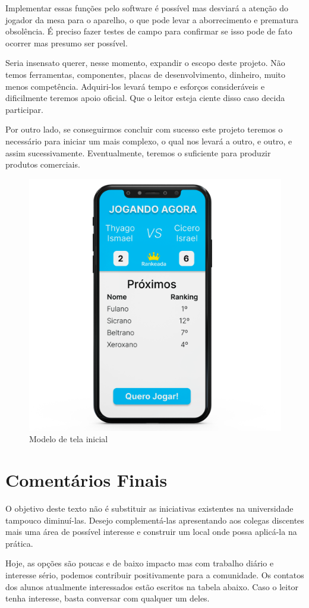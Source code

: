\documentclass[12pt]{article}
\begin{document}
\begin{multicols}{2}
    Implementar essas funções pelo software é possível mas desviará a atenção do jogador da mesa para o aparelho, o que pode levar a aborrecimento e prematura obsolência. É preciso fazer testes de campo para confirmar se isso pode de fato ocorrer mas presumo ser possível.

    Seria insensato querer, nesse momento, expandir o escopo deste projeto. Não temos ferramentas, componentes, placas de desenvolvimento, dinheiro, muito menos competência. Adquiri-los levará tempo e esforços consideráveis e dificilmente teremos apoio oficial. Que o leitor esteja ciente disso caso decida participar.

    Por outro lado, se conseguirmos concluir com sucesso este projeto teremos o necessário para iniciar um mais complexo, o qual nos levará a outro, e outro, e assim sucessivamente. Eventualmente, teremos o suficiente para produzir produtos comerciais.
\end{multicols}

\begin{figure}[t]
    \centering
    \includegraphics[width=0.6\linewidth]{img/telaInicial.png}
    \caption{Modelo de tela inicial}
    \label{fig:telaInicial}
\end{figure}


\section{Comentários Finais}
\begin{multicols}{2}
    O objetivo deste texto não é substituir as iniciativas existentes na universidade tampouco diminuí-las. Desejo complementá-las apresentando aos colegas discentes mais uma área de possível interesse e construir um local onde possa aplicá-la na prática.

    Hoje, as opções são poucas e de baixo impacto mas com trabalho diário e interesse sério, podemos contribuir positivamente para a comunidade. Os contatos dos alunos atualmente interessados estão escritos na tabela abaixo. Caso o leitor tenha interesse, basta conversar com qualquer um deles.
\end{multicols}
\end{document}

